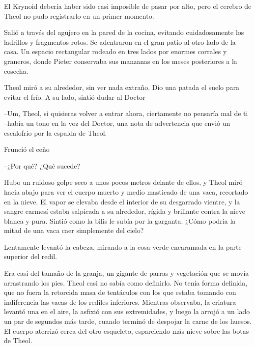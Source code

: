 El Krynoid debería haber sido casi imposible de pasar por alto, pero el cerebro de Theol no pudo registrarlo en un primer momento.



Salió a través del agujero en la pared de la cocina, evitando cuidadosamente los ladrillos y fragmentos rotos. Se adentraron en el gran patio al otro lado de la casa. Un espacio rectangular rodeado en tres lados por enormes corrales y graneros, donde Pieter conservaba sus manzanas en los meses posteriores a la cosecha.



Theol miró a su alrededor, sin ver nada extraño. Dio una patada el suelo para evitar el frío. A su lado, sintió dudar al Doctor 

--Um, Theol, si quisieras volver a entrar ahora, ciertamente no pensaría mal de ti --había un tono en la voz del Doctor, una nota de advertencia que envió un escalofrío por la espalda de Theol.



Frunció el ceño 

--¿Por qué? ¿Qué sucede?



Hubo un ruidoso golpe seco a unos pocos metros delante de ellos, y Theol miró hacia abajo para ver el cuerpo muerto y medio masticado de una vaca, recortado en la nieve. El vapor se elevaba desde el interior de su desgarrado vientre, y la sangre carmesí estaba salpicada a su alrededor, rígida y brillante contra la nieve blanca y pura. Sintió como la bilis le subía por la garganta. ¿Cómo podría la mitad de una vaca caer simplemente del cielo?



Lentamente levantó la cabeza, mirando a la cosa verde encaramada en la parte superior del redil.



Era casi del tamaño de la granja, un gigante de parras y vegetación que se movía arrastrando los pies. Theol casi no sabía como definirlo. No tenía forma definida, que no fuera la retorcida masa de tentáculos con los que estaba tomando con indiferencia las vacas de los rediles inferiores. Mientras observaba, la criatura levantó una en el aire, la asfixió con sus extremidades, y luego la arrojó a un lado un par de segundos más tarde, cuando terminó de despojar la carne de los huesos. El cuerpo aterrizó cerca del otro esqueleto, esparciendo más nieve sobre las botas de Theol.



